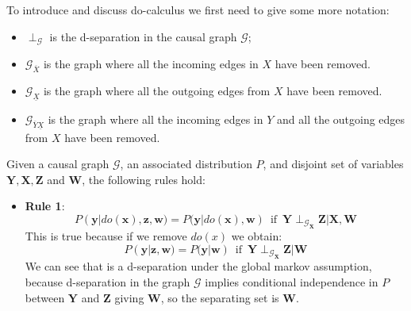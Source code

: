 To introduce and discuss do-calculus we first need to give some more notation:
\begin{itemize}
    \item $\perp_\mathcal{G}$ is the d-separation in the causal graph $\mathcal{G}$;
    \item $\mathcal{G}_{\overline{X}}$ is the graph where all the incoming edges
          in $X$ have been removed.
    \item $\mathcal{G}_{\underline{X}}$ is the graph where all the outgoing edges
          from $X$ have been removed.
    \item $\mathcal{G}_{\overline{Y}\underline{X}}$ is the graph where all the
          incoming edges in $Y$ and all the outgoing edges from $X$ have been removed.
\end{itemize}
\begin{definition}
    Given a causal graph $\mathcal{G}$, an associated distribution $P$, and
    disjoint set of variables $\mathbf{Y}, \mathbf{X}, \mathbf{Z}$ and $\mathbf{W}$,
    the following rules hold:
    \begin{itemize}
        \item \textbf{Rule 1}:
              \begin{equation}
                  P(\mathbf{y} | do(\mathbf{x}), \mathbf{z}, \mathbf{w}) =
                  P(\mathbf{y} | do(\mathbf{x}), \mathbf{w}) \, \text{ if } \, \mathbf{Y}
                  \perp_{\mathcal{G}_{\overline{\mathbf{X}}}} \mathbf{Z} | \mathbf{X}, \mathbf{W}
              \end{equation}
              This is true because if we remove $do(x)$ we obtain:
              \begin{equation*}
                  P(\mathbf{y} |\mathbf{z}, \mathbf{w}) = P(\mathbf{y} | \mathbf{w}) \, \text{ if } \, \mathbf{Y}
                  \perp_{\mathcal{G}_{\overline{\mathbf{X}}}} \mathbf{Z} | \mathbf{W}
              \end{equation*}
              We can see that is a d-separation under the global markov assumption,
              because d-separation in the graph $\mathcal{G}$ implies conditional
              independence in $P$ between $\mathbf{Y}$ and $\mathbf{Z}$ giving
              $\mathbf{W}$, so the separating set is $\mathbf{W}$.


\end{itemize}
\end{definition}
